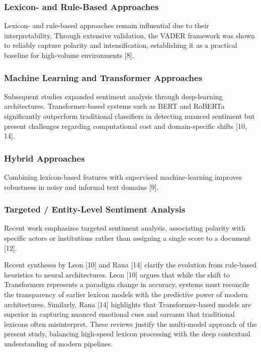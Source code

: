 \subsubsection{\texorpdfstring{\textbf{Lexicon- and Rule-Based Approaches}}{Lexicon- and Rule-Based Approaches}}\label{lexicon--and-rule-based-approaches}

Lexicon- and rule-based approaches remain influential due to their interpretability. Through extensive validation, the VADER framework was shown to reliably capture polarity and intensification, establishing it as a practical baseline for high-volume environments {[}8{]}.

\subsubsection{\texorpdfstring{\textbf{Machine Learning and Transformer Approaches}}{Machine Learning and Transformer Approaches}}\label{machine-learning-and-transformer-approaches}

Subsequent studies expanded sentiment analysis through deep-learning architectures. Transformer-based systems such as BERT and RoBERTa significantly outperform traditional classifiers in detecting nuanced sentiment but present challenges regarding computational cost and domain-specific shifts {[}10, 14{]}.

\subsubsection{\texorpdfstring{\textbf{Hybrid Approaches}}{Hybrid Approaches}}\label{hybrid-approaches}

Combining lexicon-based features with supervised machine-learning improves robustness in noisy and informal text domains {[}9{]}.

\subsubsection{\texorpdfstring{\textbf{Targeted / Entity-Level Sentiment Analysis}}{Targeted / Entity-Level Sentiment Analysis}}\label{targeted-entity-level-sentiment-analysis}

Recent work emphasizes targeted sentiment analysis, associating polarity with specific actors or institutions rather than assigning a single score to a document {[}12{]}.

Recent syntheses by Leon {[}10{]} and Rana {[}14{]} clarify the evolution from rule-based heuristics to neural architectures. Leon {[}10{]} argues that while the shift to Transformers represents a paradigm change in accuracy, systems must reconcile the transparency of earlier lexicon models with the predictive power of modern architectures. Similarly, Rana {[}14{]} highlights that Transformer-based models are superior in capturing nuanced emotional cues and sarcasm that traditional lexicons often misinterpret. These reviews justify the multi-model approach of the present study, balancing high-speed lexicon processing with the deep contextual understanding of modern pipelines.


